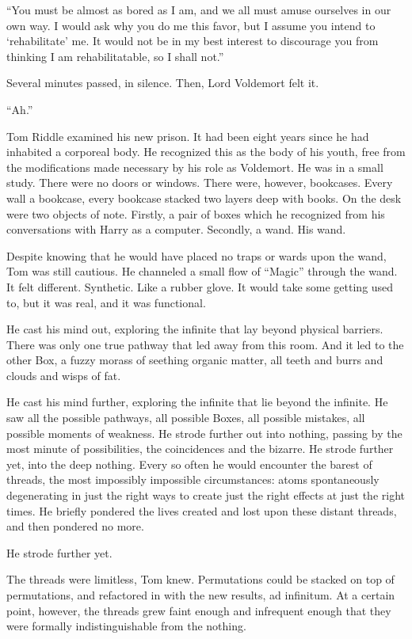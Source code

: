 “You must be almost as bored as I am, and we all must amuse ourselves in our own way. I would ask why you do me this favor, but I assume you intend to ‘rehabilitate’ me. It would not be in my best interest to discourage you from thinking I am rehabilitatable, so I shall not.”

Several minutes passed, in silence. Then, Lord Voldemort felt it.

“Ah.”
\simpleline

Tom Riddle examined his new prison. It had been eight years since he had inhabited a corporeal body. He recognized this as the body of his youth, free from the modifications made necessary by his role as Voldemort. He was in a small study. There were no doors or windows. There were, however, bookcases. Every wall a bookcase, every bookcase stacked two layers deep with books. On the desk were two objects of note. Firstly, a pair of boxes which he recognized from his conversations with Harry as a computer. Secondly, a wand. His wand.

Despite knowing that he would have placed no traps or wards upon the wand, Tom was still cautious. He channeled a small flow of “Magic” through the wand. It felt different. Synthetic. Like a rubber glove. It would take some getting used to, but it was real, and it was functional.

He cast his mind out, exploring the infinite that lay beyond physical barriers. There was only one true pathway that led away from this room. And it led to the other Box, a fuzzy morass of seething organic matter, all teeth and burrs and clouds and wisps of fat.

He cast his mind further, exploring the infinite that lie beyond the infinite. He saw all the possible pathways, all possible Boxes, all possible mistakes, all possible moments of weakness. He strode further out into nothing, passing by the most minute of possibilities, the coincidences and the bizarre. He strode further yet, into the deep nothing. Every so often he would encounter the barest of threads, the most impossibly impossible circumstances: atoms spontaneously degenerating in just the right ways to create just the right effects at just the right times. He briefly pondered the lives created and lost upon these distant threads, and then pondered no more.

He strode further yet.

The threads were limitless, Tom knew. Permutations could be stacked on top of permutations, and refactored in with the new results, ad infinitum. At a certain point, however, the threads grew faint enough and infrequent enough that they were formally indistinguishable from the nothing.

